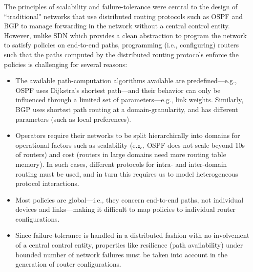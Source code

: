 The principles of scalability and failure-tolerance 
were central to the design
of ``traditional" networks that use distributed
routing protocols such as OSPF and BGP 
to manage forwarding in the 
network without a central control entity.
However, unlike SDN which provides a clean abstraction
to program the network to satisfy policies 
on end-to-end paths,
programming (i.e., configuring) 
routers such that the paths computed by
the distributed routing protocols enforce the 
policies is challenging for several reasons: 
\begin{itemize}
\item The available path-computation algorithms
available are predefined---e.g., OSPF uses
Dijkstra's shortest path---and their behavior can only be influenced
through a limited set of parameters---e.g.,
link weights. Similarly, BGP uses shortest
path routing at a domain-granularity, and has different
parameters (such as local preferences).  
\item Operators require their networks to be split hierarchically into
  domains for operational factors such as scalability (e.g., OSPF does
  not scale beyond 10s of routers) and cost (routers in large domains
  need more routing table memory). In such cases, different protocols
  for intra- and inter-domain routing must be used, and in turn this
  requires us to model heterogeneous protocol interactions.
\item Most policies are
global---i.e., they concern end-to-end paths, not individual devices and
links---making it difficult to map policies to
individual router configurations. 
\item Since failure-tolerance is handled in a distributed 
fashion with no involvement of a central control entity,  
properties like resilience (path availability) under bounded
number of network failures must be taken into account in
the generation of router configurations. 

\end{itemize}


